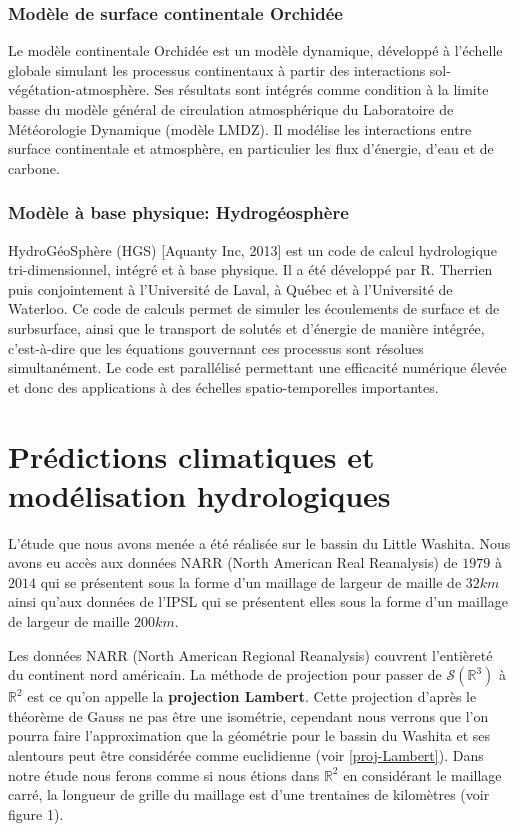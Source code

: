 \documentclass[a4paper,11pt]{article}
\begin{document}
\subsubsection{Modèle de surface continentale Orchidée}

Le modèle continentale Orchidée est un modèle dynamique, développé à l’échelle globale simulant les processus continentaux à partir des interactions sol-végétation-atmosphère. Ses résultats sont intégrés comme condition à la limite basse du modèle général de circulation atmosphérique du Laboratoire de Météorologie Dynamique (modèle LMDZ). Il modélise les interactions entre surface continentale et atmosphère, en particulier les flux d'énergie, d'eau et de carbone. 



\subsubsection{Modèle à base physique: Hydrogéosphère}

HydroGéoSphère (HGS) [Aquanty Inc, 2013] est un code de calcul hydrologique tri-dimensionnel, intégré
et à base physique. Il a été développé par R. Therrien puis conjointement à l’Université de Laval, à Québec et à l’Université de Waterloo. Ce code de calculs permet de simuler les écoulements de surface et de surbsurface, ainsi que le transport de solutés et d’énergie de manière intégrée, c’est-à-dire que les équations gouvernant ces processus sont résolues simultanément. Le code est parallélisé permettant une efficacité numérique élevée et donc des applications à des échelles spatio-temporelles importantes.


\section{Prédictions climatiques et modélisation hydrologiques}
\label{ch-pred-cli}
L'étude que nous avons menée a été réalisée sur le bassin du Little Washita. Nous avons eu accès aux données NARR (North American Real Reanalysis) de $1979$ à $2014$ qui se présentent sous la forme d'un maillage de largeur de maille de $32 km$ ainsi qu'aux données de l'IPSL qui se présentent elles sous la forme d'un maillage de largeur de maille $200 km$.

Les données NARR (North American Regional Reanalysis) couvrent l'entièreté du continent nord américain. La méthode de projection pour passer de $\mathcal{S}(\mathbb{R}^3)$ à $\mathbb{R}^2$ est ce qu'on appelle la \textbf{projection Lambert}. Cette projection d'après le théorème de Gauss ne pas être une isométrie, cependant nous verrons que l'on pourra faire l'approximation que la géométrie pour le bassin du Washita et ses alentours peut être considérée comme euclidienne (voir \ref{proj-Lambert}). Dans notre étude nous ferons comme si nous étions dans $\mathbb{R}^2$ en considérant le maillage carré, la longueur de grille du maillage est d'une trentaines de kilomètres (voir figure 1).
\end{document}
